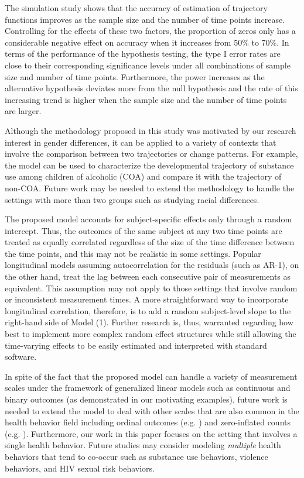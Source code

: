 The simulation study shows that the accuracy of estimation of
trajectory functions improves as the sample size and the number of
time points increase. Controlling for the effects of these two
factors, the proportion of zeros only has a considerable negative
effect on accuracy when it increases from 50\% to 70\%. In terms
of the performance of the hypothesis testing, the type I error
rates are close to their corresponding significance levels under
all combinations of sample size and number of time points.
Furthermore, the power increases as the alternative hypothesis
deviates more from the null hypothesis and the rate of this
increasing trend is higher when the sample size and the number of
time points are larger.

Although the methodology proposed in this study was motivated by
our research interest in gender differences, it can be applied to
a variety of contexts that involve the comparison between two
trajectories or change patterns. For example, the model can be
used to characterize the developmental trajectory of substance use
among children of alcoholic (COA) and compare it with the
trajectory of non-COA. Future work may be needed to extend the
methodology to handle the settings with more than two groups such
as studying racial differences.

The proposed model accounts for subject-specific effects only
through a random intercept. Thus, the outcomes of the same subject
at any two time points are treated as equally correlated
regardless of the size of the time difference between the time
points, and this may not be realistic in some settings. Popular
longitudinal models assuming autocorrelation for the residuals
(such as AR-1), on the other hand, treat the lag between each
consecutive pair of measurements as equivalent. This assumption
may not apply to those settings that involve random or
inconsistent measurement times. A more straightforward way to
incorporate longitudinal correlation, therefore, is to add a
random subject-level slope to the right-hand side of Model (1).
Further research is, thus, warranted regarding how best to
implement more complex random effect structures while still
allowing the time-varying effects to be easily estimated and
interpreted with standard software.


In spite of the fact that the proposed model can handle a variety
of measurement scales under the framework of generalized linear
models such as continuous and binary outcomes (as demonstrated in
our motivating examples), future work is needed to extend the
model to deal with other scales that are also common in the health
behavior field including ordinal outcomes (e.g. \cite{dziak14})
and zero-inflated counts (e.g. \cite{buu11,buu12}). Furthermore,
our work in this paper focuses on the setting that involves a
single health behavior. Future studies may consider modeling
\emph{multiple} health behaviors that tend to co-occur such as
substance use behaviors, violence behaviors, and HIV sexual risk
behaviors.

